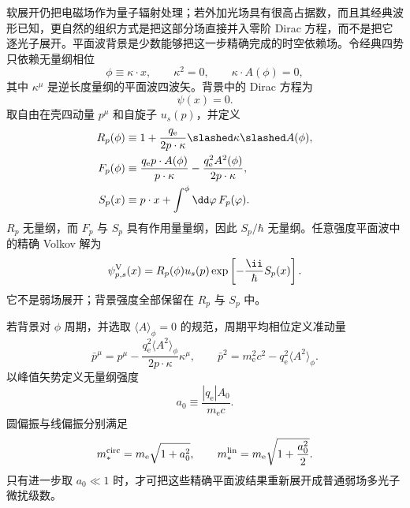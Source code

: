 软展开仍把电磁场作为量子辐射处理；若外加光场具有很高占据数，而且其经典波形已知，更自然的组织方式是把这部分场直接并入零阶 Dirac 方程，而不是把它逐光子展开。平面波背景是少数能够把这一步精确完成的时空依赖场。令经典四势只依赖无量纲相位
\begin{equation*}
 \phi\equiv\kappa\cdot x,
 \qquad
 \kappa^2=0,
 \qquad
 \kappa\cdot A(\phi)=0,
\end{equation*}
其中 $\kappa^\mu$ 是逆长度量纲的平面波四波矢。背景中的 Dirac 方程为
\begin{equation}
 [\ii\hbar\slashed\partial-q_{\mathrm e}\slashed A(\phi)-m_{\mathrm e} c]\psi(x)=0.
 \label{eq:Volkov-Dirac-r12}
\end{equation}
取自由在壳四动量 $p^\mu$ 和自旋子 $u_s(p)$，并定义
\begin{align*}
 R_p(\phi)
 &\equiv
 1+\frac{q_{\mathrm e}}{2p\cdot\kappa}
 \slashed\kappa\slashed A(\phi),\\
 F_p(\phi)
 &\equiv
 \frac{q_{\mathrm e} p\cdot A(\phi)}{p\cdot\kappa}
 -\frac{q_{\mathrm e}^2A^2(\phi)}{2p\cdot\kappa},\\
 S_p(x)
 &\equiv p\cdot x+\int^{\phi}\dd\varphi\,F_p(\varphi).
\end{align*}
$R_p$ 无量纲，而 $F_p$ 与 $S_p$ 具有作用量量纲，因此 $S_p/\hbar$ 无量纲。任意强度平面波中的精确 Volkov 解为
\begin{equation}
 {
 \psi_{p,s}^{\rm V}(x)
 =R_p(\phi)u_s(p)
 \exp\left[-\frac{\ii}{\hbar}S_p(x)\right].}
 \label{eq:Volkov-solution-r12}
\end{equation}
它不是弱场展开；背景强度全部保留在 $R_p$ 与 $S_p$ 中。

若背景对 $\phi$ 周期，并选取 $\langle A\rangle_\phi=0$ 的规范，周期平均相位定义准动量
\begin{equation}
 {
 \bar p^\mu
 =p^\mu
 -\frac{q_{\mathrm e}^2\langle A^2\rangle_\phi}{2p\cdot\kappa}\kappa^\mu,
 \qquad
 \bar p^2=m_{\mathrm e}^2c^2-q_{\mathrm e}^2\langle A^2\rangle_\phi.}
 \label{eq:volkov-quasimomentum-dp43}
\end{equation}
以峰值矢势定义无量纲强度
\begin{equation*}
 a_0\equiv\frac{|q_{\mathrm e}|A_0}{m_{\mathrm e} c}.
\end{equation*}
圆偏振与线偏振分别满足
\begin{equation}
 {
 m_*^{\rm circ}=m_{\mathrm e}\sqrt{1+a_0^2},
 \qquad
 m_*^{\rm lin}=m_{\mathrm e}\sqrt{1+\frac{a_0^2}{2}}.}
 \label{eq:volkov-effective-mass-dp43}
\end{equation}
只有进一步取 $a_0\ll1$ 时，才可把这些精确平面波结果重新展开成普通弱场多光子微扰级数。

